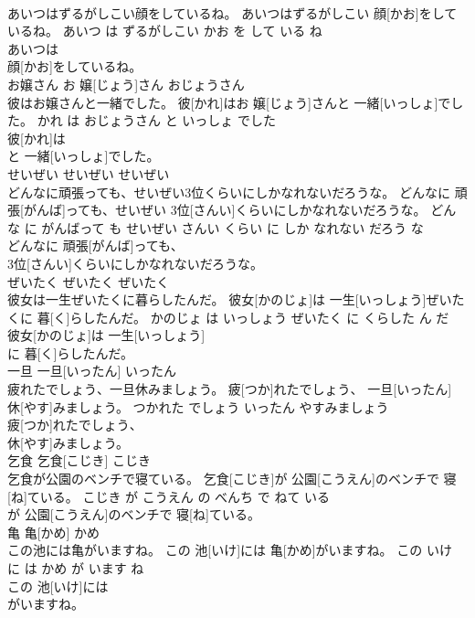 \documentclass[8pt]{extreport}
\begin{document}
\begin{CJK}{UTF8}{min}
\\	あいつはずるがしこい顔をしているね。	あいつはずるがしこい 顔[かお]をしているね。	あいつ は ずるがしこい かお を して いる ね	
\\	あいつは
\\	顔[かお]をしているね。			
\\	お嬢さん	お 嬢[じょう]さん	おじょうさん	
\\	彼はお嬢さんと一緒でした。	彼[かれ]はお 嬢[じょう]さんと 一緒[いっしょ]でした。	かれ は おじょうさん と いっしょ でした	
\\	彼[かれ]は
\\	と 一緒[いっしょ]でした。			
\\	せいぜい	せいぜい	せいぜい	
\\	どんなに頑張っても、せいぜい3位くらいにしかなれないだろうな。	どんなに 頑張[がんば]っても、せいぜい 3位[さんい]くらいにしかなれないだろうな。	どんな に がんばって も せいぜい さんい くらい に しか なれない だろう な	
\\	どんなに 頑張[がんば]っても、
\\	3位[さんい]くらいにしかなれないだろうな。			
\\	ぜいたく	ぜいたく	ぜいたく	
\\	彼女は一生ぜいたくに暮らしたんだ。	彼女[かのじょ]は 一生[いっしょう]ぜいたくに 暮[く]らしたんだ。	かのじょ は いっしょう ぜいたく に くらした ん だ	
\\	彼女[かのじょ]は 一生[いっしょう]
\\	に 暮[く]らしたんだ。			
\\	一旦	一旦[いったん]	いったん	
\\	疲れたでしょう、一旦休みましょう。	疲[つか]れたでしょう、 一旦[いったん] 休[やす]みましょう。	つかれた でしょう いったん やすみましょう	
\\	疲[つか]れたでしょう、
\\	休[やす]みましょう。			
\\	乞食	乞食[こじき]	こじき	
\\	乞食が公園のベンチで寝ている。	乞食[こじき]が 公園[こうえん]のベンチで 寝[ね]ている。	こじき が こうえん の べんち で ねて いる	
\\	が 公園[こうえん]のベンチで 寝[ね]ている。			
\\	亀	亀[かめ]	かめ	
\\	この池には亀がいますね。	この 池[いけ]には 亀[かめ]がいますね。	この いけ に は かめ が います ね	
\\	この 池[いけ]には
\\	がいますね。			

\end{CJK}
\end{document}
